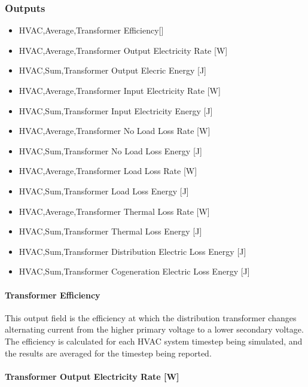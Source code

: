 \subsubsection{Outputs}\label{outputs-010}

\begin{itemize}
\item
  HVAC,Average,Transformer Efficiency{[]}
\item
  HVAC,Average,Transformer Output Electricity Rate {[}W{]}
\item
  HVAC,Sum,Transformer Output Elecric Energy {[}J{]}
\item
  HVAC,Average,Transformer Input Electricity Rate {[}W{]}
\item
  HVAC,Sum,Transformer Input Electricity Energy {[}J{]}
\item
  HVAC,Average,Transformer No Load Loss Rate {[}W{]}
\item
  HVAC,Sum,Transformer No Load Loss Energy {[}J{]}
\item
  HVAC,Average,Transformer Load Loss Rate {[}W{]}
\item
  HVAC,Sum,Transformer Load Loss Energy {[}J{]}
\item
  HVAC,Average,Transformer Thermal Loss Rate {[}W{]}
\item
  HVAC,Sum,Transformer Thermal Loss Energy {[}J{]}
\item
  HVAC,Sum,Transformer Distribution Electric Loss Energy {[}J{]}
\item
  HVAC,Sum,Transformer Cogeneration Electric Loss Energy {[}J{]}
\end{itemize}

\paragraph{Transformer Efficiency}\label{transformer-efficiency}

This output field is the efficiency at which the distribution transformer changes alternating current from the higher primary voltage to a lower secondary voltage. The efficiency is calculated for each HVAC system timestep being simulated, and the results are averaged for the timestep being reported.

\paragraph{Transformer Output Electricity Rate {[}W{]}}\label{transformer-output-electric-power-w}

